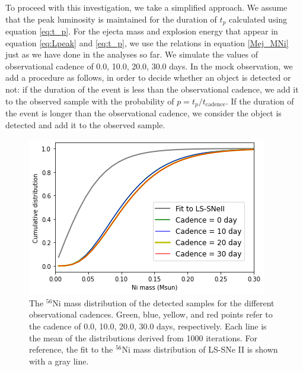 \documentclass[twocolumn, linenumbers]{aastex62}
\begin{document}
To proceed with this investigation, we take a simplified approach. We assume that the peak luminosity is maintained for the duration of $t_p$ calculated using equation \ref{eq:t_p}. For the ejecta mass and explosion energy that appear in equation \ref{eq:Lpeak} and \ref{eq:t_p}, we use the relations in equation \ref{Mej_MNi} just as we have done in the analyses so far. We simulate the values of observational cadence of 0.0, 10.0, 20.0, 30.0 days.
In the mock observation, we add a procedure as follows, 
in order to decide whether an object is detected or not: if the duration of the event is less than the observational cadence, we add it to the observed sample with the probability of $p = t_p/t_\mathrm{cadence}$. If the duration of the event is longer than the observational cadence, we consider the object is detected and add it to the observed sample.

\begin{figure}[t]
	\includegraphics[width=\columnwidth]{Ni_cum_dist_different_cadence.png}
    \caption{The $^{56}$Ni mass distribution of the detected samples for the different observational cadences. 
    Green, blue, yellow, and red points refer to the cadence of 0.0, 10.0, 20.0, 30.0 days, respectively. Each line is the mean of the distributions derived from 1000 iterations. 
    For reference, the fit to the $^{56}$Ni mass distribution  of LS-SNe II is shown with a gray line.} 
     \label{Ni_dist_different_cadence}
\end{figure}
\end{document}
